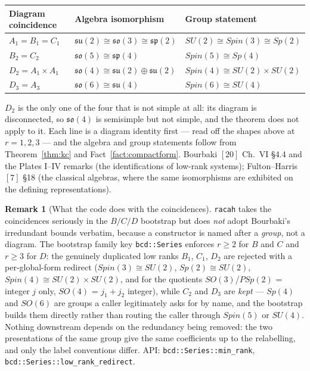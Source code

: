 \documentclass[11pt,a4paper]{article}
\theoremstyle{plain}
\theoremstyle{definition}
\newtheorem{remark}[theorem]{Remark}
\newcommand{\su}{\mathfrak{su}}
\newcommand{\so}{\mathfrak{so}}
\newcommand{\symp}{\mathfrak{sp}}
\newcommand{\code}[1]{\texttt{#1}}
\begin{document}
\begin{center}
\begin{tabular}{@{}lll@{}}
\toprule
Diagram coincidence & Algebra isomorphism & Group statement \\
\midrule
$A_1 = B_1 = C_1$ & $\su(2)\cong\so(3)\cong\symp(2)$ & $SU(2)\cong Spin(3)\cong Sp(2)$ \\
$B_2 = C_2$ & $\so(5)\cong\symp(4)$ & $Spin(5)\cong Sp(4)$ \\
$D_2 = A_1\times A_1$ & $\so(4)\cong\su(2)\oplus\su(2)$ & $Spin(4)\cong SU(2)\times SU(2)$ \\
$D_3 = A_3$ & $\so(6)\cong\su(4)$ & $Spin(6)\cong SU(4)$ \\
\bottomrule
\end{tabular}
\end{center}

\noindent
$D_2$ is the only one of the four that is not simple at all: its diagram is
disconnected, so $\so(4)$ is semisimple but not simple, and the theorem does
not apply to it. Each line is a diagram identity first --- read off the shapes
above at $r=1,2,3$ --- and the algebra and group statements follow from
Theorem~\ref{thm:kc} and Fact~\ref{fact:compactform}. Bourbaki $[20]$
Ch.~VI \S4.4 and the Plates I--IV remarks (the identifications of low-rank
systems); Fulton--Harris $[7]$ \S18 (the classical algebras, where the same
isomorphisms are exhibited on the defining representations).

\begin{remark}[What the code does with the coincidences]
\label{rem:lowrank}
\code{racah} takes the coincidences seriously in the $B/C/D$ bootstrap but
does \emph{not} adopt Bourbaki's irredundant bounds verbatim, because a
constructor is named after a \emph{group}, not a diagram. The bootstrap family
key \code{bcd::Series} enforces $r\ge 2$ for $B$ and $C$ and $r\ge 3$ for $D$:
the genuinely duplicated low ranks $B_1$, $C_1$, $D_2$ are rejected with a
per-global-form redirect ($Spin(3)\cong SU(2)$, $Sp(2)\cong SU(2)$,
$Spin(4)\cong SU(2)\times SU(2)$, and for the quotients $SO(3)$/$PSp(2)$ =
integer $j$ only, $SO(4)$ = $j_1+j_2$ integer), while $C_2$ and $D_3$ are
\emph{kept} --- $Sp(4)$ and $SO(6)$ are groups a caller legitimately asks for
by name, and the bootstrap builds them directly rather than routing the caller
through $Spin(5)$ or $SU(4)$. Nothing downstream depends on the redundancy
being removed: the two presentations of the same group give the same
coefficients up to the relabelling, and only the label conventions differ.
API: \code{bcd::Series::min\_rank}, \code{bcd::Series::low\_rank\_redirect}.
\end{remark}
\end{document}
